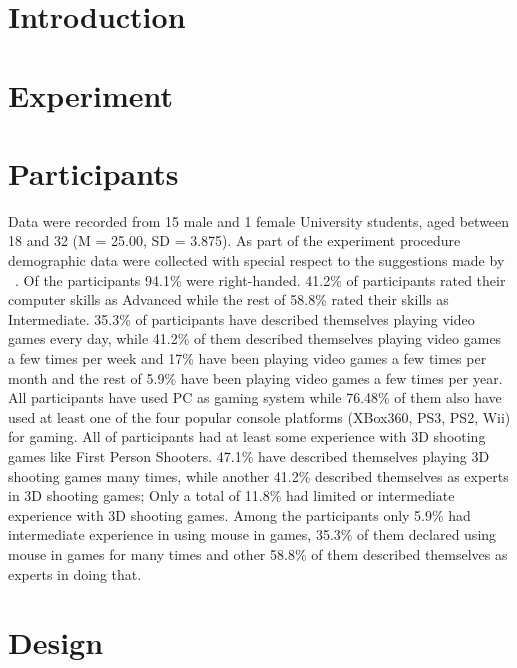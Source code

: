 
\section{Introduction}

\section{Experiment}


\section{Participants}
Data were recorded from 15 male and 1 female University students, aged between 18 and 32 (M = 25.00, SD = 3.875). As part of the experiment procedure demographic data were collected with special respect to the suggestions made by ~\cite{?}. Of the participants 94.1\% were right-handed. 41.2\% of participants rated their computer skills as Advanced while the rest of 58.8\% rated their skills as Intermediate. 35.3\% of participants have described themselves playing video games every day, while 41.2\% of them described themselves playing video games a few times per week and 17\% have been playing video games a few times per month and the rest of 5.9\% have been playing video games a few times per year. All participants have used PC as gaming system while 76.48\% of them also have used at least one of the four popular console platforms (XBox360, PS3, PS2, Wii) for gaming. All of participants had at least some experience with 3D shooting games like First Person Shooters. 47.1\% have described themselves playing 3D shooting games many times, while another 41.2\% described themselves as experts in 3D shooting games; Only a total of 11.8\% had limited or intermediate experience with 3D shooting games. Among the participants only 5.9\% had intermediate experience in using mouse in games, 35.3\% of them declared using mouse in games for many times and other 58.8\% of them described themselves as experts in doing that.

\section{Design}

